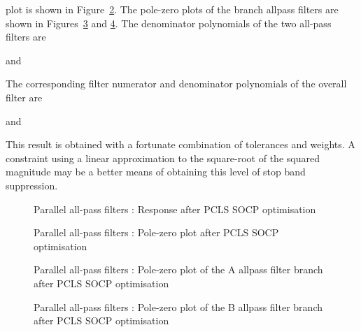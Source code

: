 \documentclass[a4paper,twoside,10pt,english]{report}
\begin{document}
plot is shown in Figure~\ref{fig:Parallel-allpass-filter-PCLS-SOCP-pz}. The
pole-zero plots of the branch allpass filters are shown in
Figures~\ref{fig:Parallel-allpass-filter-PCLS-SOCP-a1pz} and
\ref{fig:Parallel-allpass-filter-PCLS-SOCP-b1pz}. The denominator polynomials
of the two all-pass filters are
\begin{small}

\end{small}
and
\begin{small}

\end{small}
The corresponding filter numerator and denominator polynomials of the overall
filter are
\begin{small}

\end{small}
and
\begin{small}

\end{small}
This result is obtained with a fortunate combination of tolerances and
weights. A constraint using a linear approximation to the square-root of the
squared magnitude may be a better means of obtaining this level of stop band
suppression.

\begin{figure}[!htbp]
\begin{center}
\scalebox{0.7}{}
\caption{Parallel all-pass filters : Response after PCLS SOCP optimisation}
\label{fig:Parallel-allpass-filter-PCLS-SOCP-response}
\end{center}
\end{figure}
\begin{figure}[!htbp]
\begin{center}
\scalebox{0.7}{}
\caption{Parallel all-pass filters : Pole-zero plot after PCLS SOCP optimisation}
\label{fig:Parallel-allpass-filter-PCLS-SOCP-pz}
\end{center}
\end{figure}
\begin{figure}[!htbp]
\begin{center}
\scalebox{0.7}{}
\caption{Parallel all-pass filters : Pole-zero plot of the A allpass filter branch after PCLS SOCP optimisation}
\label{fig:Parallel-allpass-filter-PCLS-SOCP-a1pz}
\end{center}
\end{figure}
\begin{figure}[!htbp]
\begin{center}
\scalebox{0.7}{}
\caption{Parallel all-pass filters : Pole-zero plot of the B allpass filter branch after PCLS SOCP optimisation}
\label{fig:Parallel-allpass-filter-PCLS-SOCP-b1pz}
\end{center}
\end{figure}
\clearpage
\end{document}
